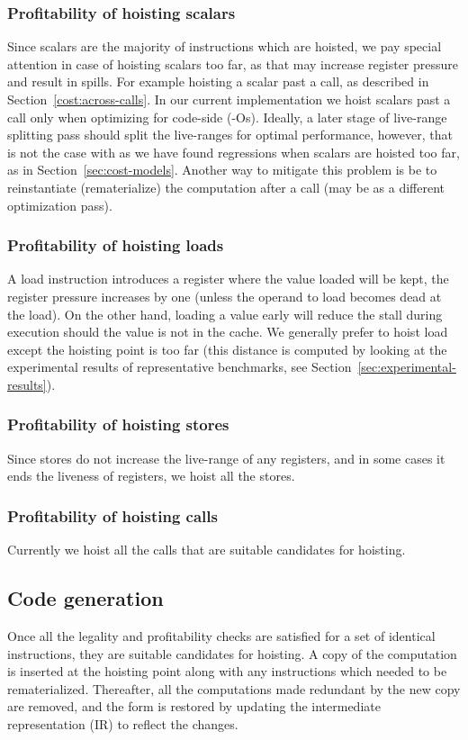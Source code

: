 \documentclass{sig-alternate}
\begin{document}
\subsubsection{Profitability of hoisting scalars}
Since scalars are the majority of instructions which are hoisted, we pay special
attention in case of hoisting scalars too far, as that may increase register
pressure and result in spills. For example hoisting a scalar past a call, as
described in Section~\ref{cost:across-calls}.  In our current implementation we
hoist scalars past a call only when optimizing for code-side (-Os). Ideally, a
later stage of live-range splitting pass should split the live-ranges for
optimal performance, however, that is not the case with \LLVM{} as we have found
regressions when scalars are hoisted too far, as in
Section~\ref{sec:cost-models}. Another way to mitigate this problem is be to
reinstantiate (rematerialize) the computation after a call (may be as a
different optimization pass).

\subsubsection{Profitability of hoisting loads}
A load instruction introduces a register where the value loaded will be kept,
the register pressure increases by one (unless the operand to load becomes dead
at the load). On the other hand, loading a value early will reduce the stall
during execution should the value is not in the cache. We generally prefer to
hoist load except the hoisting point is too far (this distance is computed by
looking at the experimental results of representative benchmarks, see
Section~\ref{sec:experimental-results}).

\subsubsection{Profitability of hoisting stores}
Since stores do not increase the live-range of any registers, and in some cases
it ends the liveness of registers, we hoist all the stores.

\subsubsection{Profitability of hoisting calls}
Currently we hoist all the calls that are suitable candidates for hoisting.

\subsection{Code generation}
Once all the legality and profitability checks are satisfied for a set of
identical instructions, they are suitable candidates for hoisting. A copy of the
computation is inserted at the hoisting point along with any instructions which
needed to be rematerialized. Thereafter, all the computations made redundant by
the new copy are removed, and the \SSA{} form is restored by updating the
intermediate representation (IR) to reflect the changes.
\end{document}
